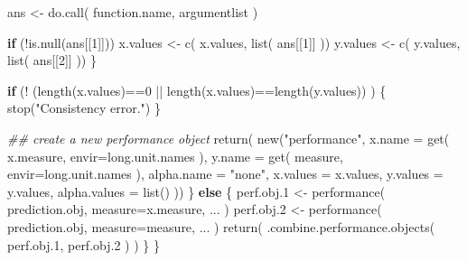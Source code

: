 \documentclass[
  letterpaper,
  DIV=11,
  numbers=noendperiod]{scrartcl}
\newenvironment{Shaded}{\begin{snugshade}}{\end{snugshade}}
\newcommand{\AttributeTok}[1]{\textcolor[rgb]{0.40,0.45,0.13}{#1}}
\newcommand{\ControlFlowTok}[1]{\textcolor[rgb]{0.00,0.23,0.31}{\textbf{#1}}}
\newcommand{\DecValTok}[1]{\textcolor[rgb]{0.68,0.00,0.00}{#1}}
\newcommand{\DocumentationTok}[1]{\textcolor[rgb]{0.37,0.37,0.37}{\textit{#1}}}
\newcommand{\FloatTok}[1]{\textcolor[rgb]{0.68,0.00,0.00}{#1}}
\newcommand{\FunctionTok}[1]{\textcolor[rgb]{0.28,0.35,0.67}{#1}}
\newcommand{\NormalTok}[1]{\textcolor[rgb]{0.00,0.23,0.31}{#1}}
\newcommand{\OtherTok}[1]{\textcolor[rgb]{0.00,0.23,0.31}{#1}}
\newcommand{\SpecialCharTok}[1]{\textcolor[rgb]{0.37,0.37,0.37}{#1}}
\newcommand{\StringTok}[1]{\textcolor[rgb]{0.13,0.47,0.30}{#1}}
\begin{document}
\begin{Shaded}
\begin{Highlighting}[]
\NormalTok{            ans }\OtherTok{\textless{}{-}} \FunctionTok{do.call}\NormalTok{( function.name, argumentlist )}

            \ControlFlowTok{if}\NormalTok{ (}\SpecialCharTok{!}\FunctionTok{is.null}\NormalTok{(ans[[}\DecValTok{1}\NormalTok{]])) x.values }\OtherTok{\textless{}{-}} \FunctionTok{c}\NormalTok{( x.values, }\FunctionTok{list}\NormalTok{( ans[[}\DecValTok{1}\NormalTok{]] ))}
\NormalTok{            y.values }\OtherTok{\textless{}{-}} \FunctionTok{c}\NormalTok{( y.values, }\FunctionTok{list}\NormalTok{( ans[[}\DecValTok{2}\NormalTok{]] ))}
\NormalTok{        \}}

        \ControlFlowTok{if}\NormalTok{ (}\SpecialCharTok{!}\NormalTok{ (}\FunctionTok{length}\NormalTok{(x.values)}\SpecialCharTok{==}\DecValTok{0} \SpecialCharTok{||} \FunctionTok{length}\NormalTok{(x.values)}\SpecialCharTok{==}\FunctionTok{length}\NormalTok{(y.values)) ) \{}
            \FunctionTok{stop}\NormalTok{(}\StringTok{"Consistency error."}\NormalTok{)}
\NormalTok{        \}}
        
        \DocumentationTok{\#\# create a new performance object}
        \FunctionTok{return}\NormalTok{( }\FunctionTok{new}\NormalTok{(}\StringTok{"performance"}\NormalTok{,}
                    \AttributeTok{x.name       =} \FunctionTok{get}\NormalTok{( x.measure, }\AttributeTok{envir=}\NormalTok{long.unit.names ),}
                    \AttributeTok{y.name       =} \FunctionTok{get}\NormalTok{( measure, }\AttributeTok{envir=}\NormalTok{long.unit.names ),}
                    \AttributeTok{alpha.name   =} \StringTok{"none"}\NormalTok{,}
                    \AttributeTok{x.values     =}\NormalTok{ x.values,}
                    \AttributeTok{y.values     =}\NormalTok{ y.values,}
                    \AttributeTok{alpha.values =} \FunctionTok{list}\NormalTok{() ))}
\NormalTok{    \} }\ControlFlowTok{else}\NormalTok{ \{}
\NormalTok{        perf.obj}\FloatTok{.1} \OtherTok{\textless{}{-}} \FunctionTok{performance}\NormalTok{( prediction.obj, }\AttributeTok{measure=}\NormalTok{x.measure, ... )}
\NormalTok{        perf.obj}\FloatTok{.2} \OtherTok{\textless{}{-}} \FunctionTok{performance}\NormalTok{( prediction.obj, }\AttributeTok{measure=}\NormalTok{measure, ... )}
        \FunctionTok{return}\NormalTok{( }\FunctionTok{.combine.performance.objects}\NormalTok{( perf.obj}\FloatTok{.1}\NormalTok{, perf.obj}\FloatTok{.2}\NormalTok{ ) )}
\NormalTok{    \}}
\NormalTok{\}}


\end{Highlighting}
\end{Shaded}
\end{document}
